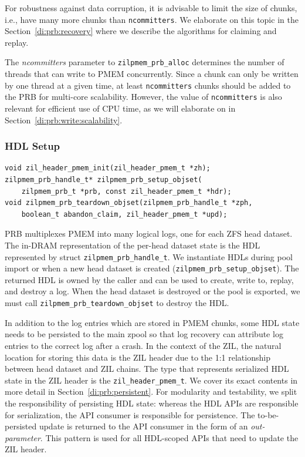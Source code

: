 \documentclass[12pt,a4paper,twoside]{book}
\begin{document}
For robustness against data corruption, it is advisable to limit the size of chunks, i.e., have many more chunks than \lstinline{ncommitters}.
We elaborate on this topic in the Section~\ref{di:prb:recovery} where we describe the algorithms for claiming and replay.

The \textit{ncommitters} parameter to \lstinline{zilpmem_prb_alloc} determines the number of threads that can write to PMEM concurrently.
Since a chunk can only be written by one thread at a given time, at least \lstinline{ncommitters} chunks should be added to the PRB for multi-core scalability.
However, the value of \lstinline{ncommitters} is also relevant for efficient use of CPU time, as we will elaborate on in Section~\ref{di:prb:write:scalability}.

\subsubsection{HDL Setup}\label{di:prb:api:hdl}
\begin{lstlisting}
void zil_header_pmem_init(zil_header_pmem_t *zh);
zilpmem_prb_handle_t* zilpmem_prb_setup_objset(
    zilpmem_prb_t *prb, const zil_header_pmem_t *hdr);
void zilpmem_prb_teardown_objset(zilpmem_prb_handle_t *zph,
    boolean_t abandon_claim, zil_header_pmem_t *upd);
\end{lstlisting}

PRB multiplexes PMEM into many logical logs, one for each ZFS head dataset.
The in-DRAM representation of the per-head dataset state is the HDL represented by struct \lstinline{zilpmem_prb_handle_t}.
We instantiate HDLs during pool import or when a new head dataset is created (\lstinline{zilpmem_prb_setup_objset}).
The returned HDL is owned by the caller and can be used to create, write to, replay, and destroy a log.
When the head dataset is destroyed or the pool is exported, we must call \lstinline{zilpmem_prb_teardown_objset} to destroy the HDL.

In addition to the log entries which are stored in PMEM chunks, some HDL state needs to be persisted to the main zpool so that log recovery can attribute log entries to the correct log after a crash.
In the context of the ZIL, the natural location for storing this data is the ZIL header due to the 1:1 relationship between head dataset and ZIL chains.
The type that represents serialized HDL state in the ZIL header is the \lstinline{zil_header_pmem_t}.
We cover its exact contents in more detail in Section~\ref{di:prb:persistent}.
For modularity and testability, we split the responsibility of persisting HDL state: whereas the HDL APIs are responsible for serialization, the API consumer is responsible for persistence.
The to-be-persisted update is returned to the API consumer in the form of an \textit{out-parameter}.
This pattern is used for all HDL-scoped APIs that need to update the ZIL header.
\end{document}
